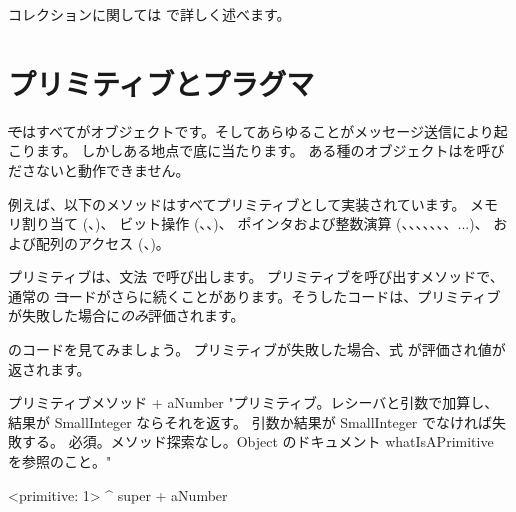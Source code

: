 \documentclass[a4paper,10pt,twoside]{book}
\begin{document}
コレクションに関しては  で詳しく述べます。

\section{プリミティブとプラグマ}

\st ではすべてがオブジェクトです。そしてあらゆることがメッセージ送信により起こります。
しかしある地点で底に当たります。
ある種のオブジェクトはを呼びださないと動作できません。

例えば、以下のメソッドはすべてプリミティブとして実装されています。
メモリ割り当て (、)、
ビット操作 (、、)、
ポインタおよび整数演算 (\ct{+}、\ct{-}、\ct{<}、\ct{>}、\ct{*}、\ct{/ }、\ct{=}、\ct{==}...)、
および配列のアクセス (、)。

プリミティブは、文法  で呼び出します。
プリミティブを呼び出すメソッドで、通常の \st コードがさらに続くことがあります。そうしたコードは、プリミティブが失敗した場合に\emph{のみ}評価されます。

のコードを見てみましょう。
プリミティブが失敗した場合、式  が評価され値が返されます。

\begin{method}[primitive]{プリミティブメソッド}
+ aNumber 
  "プリミティブ。レシーバと引数で加算し、結果が SmallInteger ならそれを返す。
  引数か結果が SmallInteger でなければ失敗する。
  必須。メソッド探索なし。Object のドキュメント whatIsAPrimitive を参照のこと。"

  <primitive: 1>
  ^ super + aNumber
\end{method}

\end{document}
